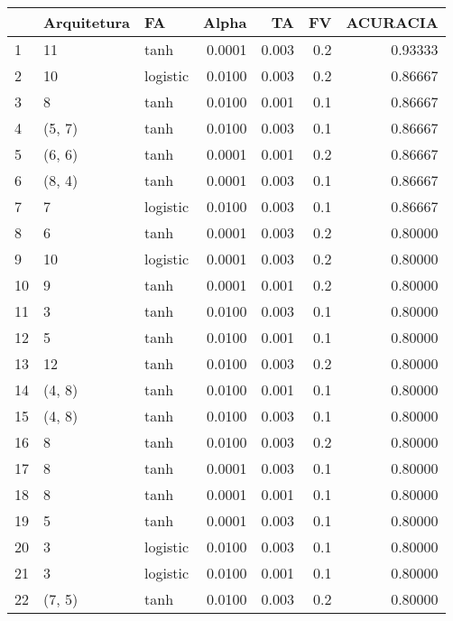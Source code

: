\begin{tabular}{lllrrrr}
\toprule
{} & Arquitetura &        FA &   Alpha &     TA &   FV &  ACURACIA \\
\midrule
1   &          11 &      tanh &  0.0001 &  0.003 &  0.2 &   0.93333 \\
2   &          10 &  logistic &  0.0100 &  0.003 &  0.2 &   0.86667 \\
3   &           8 &      tanh &  0.0100 &  0.001 &  0.1 &   0.86667 \\
4   &      (5, 7) &      tanh &  0.0100 &  0.003 &  0.1 &   0.86667 \\
5   &      (6, 6) &      tanh &  0.0001 &  0.001 &  0.2 &   0.86667 \\
6   &      (8, 4) &      tanh &  0.0001 &  0.003 &  0.1 &   0.86667 \\
7   &           7 &  logistic &  0.0100 &  0.003 &  0.1 &   0.86667 \\
8   &           6 &      tanh &  0.0001 &  0.003 &  0.2 &   0.80000 \\
9   &          10 &  logistic &  0.0001 &  0.003 &  0.2 &   0.80000 \\
10  &           9 &      tanh &  0.0001 &  0.001 &  0.2 &   0.80000 \\
11  &           3 &      tanh &  0.0100 &  0.003 &  0.1 &   0.80000 \\
12  &           5 &      tanh &  0.0100 &  0.001 &  0.1 &   0.80000 \\
13  &          12 &      tanh &  0.0100 &  0.003 &  0.2 &   0.80000 \\
14  &      (4, 8) &      tanh &  0.0100 &  0.001 &  0.1 &   0.80000 \\
15  &      (4, 8) &      tanh &  0.0100 &  0.003 &  0.1 &   0.80000 \\
16  &           8 &      tanh &  0.0100 &  0.003 &  0.2 &   0.80000 \\
17  &           8 &      tanh &  0.0001 &  0.003 &  0.1 &   0.80000 \\
18  &           8 &      tanh &  0.0001 &  0.001 &  0.1 &   0.80000 \\
19  &           5 &      tanh &  0.0001 &  0.003 &  0.1 &   0.80000 \\
20  &           3 &  logistic &  0.0100 &  0.003 &  0.1 &   0.80000 \\
21  &           3 &  logistic &  0.0100 &  0.001 &  0.1 &   0.80000 \\
22  &      (7, 5) &      tanh &  0.0100 &  0.003 &  0.2 &   0.80000 \\

\end{tabular}
